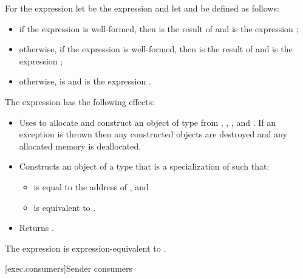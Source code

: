 \pnum
For the expression 
let  be the expression  and
let  and  be defined as follows:
\begin{itemize}
\item
if the expression  is well-formed, then
 is the result of  and
 is the expression ;
\item
otherwise,
if the expression  is well-formed, then
 is the result of  and
 is the expression
;
\item
otherwise,
 is  and
 is the expression .
\end{itemize}

\pnum
The expression 
has the following effects:

\begin{itemize}
\item
Uses  to allocate and construct an object  of type
from , , , and .
If an exception is thrown then
any constructed objects are destroyed and
any allocated memory is deallocated.

\item
Constructs an object  of
a type that is a specialization of  such that:
  \begin{itemize}
  \item
   is equal to the address of , and
  \item
   is equivalent to
  .
  \end{itemize}

\item
Returns .
\end{itemize}

\pnum
The expression  is expression-equivalent to
.

[exec.consumers]{Sender consumers}

